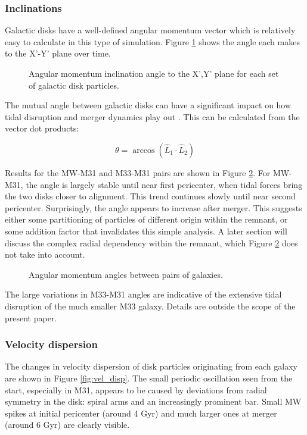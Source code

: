 \documentclass[twocolumn]{aastex63}
\newcommand{\todo}{\color{red}{TODO}\color{black}\hspace{2mm}}
\begin{document}
\subsubsection{Inclinations}

Galactic disks have a well-defined angular momentum vector which is relatively easy to calculate in this type of simulation. Figure \ref{fig:inclinations_xy} shows the angle each makes to the X'-Y' plane over time.

\begin{figure}[ht!]
	\caption{Angular momentum inclination angle to the X',Y' plane for each set of galactic disk particles.
		\label{fig:inclinations_xy}}
\end{figure}

The mutual angle between galactic disks can have a significant impact on how tidal disruption and merger dynamics play out \todo{ref?}. This can be calculated from the vector dot products:

\[ \theta = \arccos (\hat{L}_1 \cdot \hat{L}_2 ) \]

Results for the MW-M31 and M33-M31 pairs are shown in Figure \ref{fig:inclinations_mutual}. For MW-M31, the angle is largely stable until near first pericenter, when tidal forces bring the two disks closer to alignment. This trend continues slowly until near second pericenter. Surprisingly, the angle appears to increase after merger. This suggests either some partitioning of particles of different origin within the remnant, or some addition factor that invalidates this simple analysis. A later section will discuss the complex radial dependency within the remnant, which Figure \ref{fig:inclinations_mutual} does not take into account.

\begin{figure}[ht!]
	\caption{Angular momentum angles between pairs of galaxies.
		\label{fig:inclinations_mutual}}
\end{figure}

The large variations in M33-M31 angles are indicative of the extensive tidal disruption of the much smaller M33 galaxy. Details are outside the scope of the present paper.

\subsubsection{Velocity dispersion}

The changes in velocity dispersion of disk particles originating from each galaxy are shown in Figure \ref{fig:vel_disp}. The small periodic oscillation seen from the start, especially in M31, appears to be caused by deviations from radial symmetry in the disk: spiral arms and an increasingly prominent bar. Small MW spikes at initial pericenter (around 4 Gyr) and much larger ones at merger (around 6 Gyr) are clearly visible.
\end{document}
